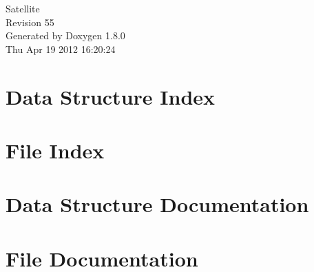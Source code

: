 \documentclass{book}
\begin{document}
\hypersetup{pageanchor=false,citecolor=blue}
\begin{titlepage}
\vspace*{7cm}
\begin{center}
{\Large Satellite \\[1ex]\large Revision 55 }\\
\vspace*{1cm}
{\large Generated by Doxygen 1.8.0}\\
\vspace*{0.5cm}
{\small Thu Apr 19 2012 16:20:24}\\
\end{center}
\end{titlepage}
\clearemptydoublepage
{}
\tableofcontents
\clearemptydoublepage
{}
\hypersetup{pageanchor=true,citecolor=blue}
\chapter{Data Structure Index}

\chapter{File Index}

\chapter{Data Structure Documentation}


\chapter{File Documentation}



















\printindex
\end{document}
